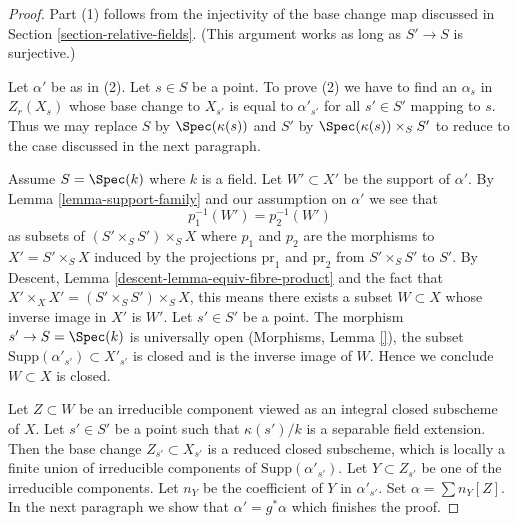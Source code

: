 \begin{proof}
Part (1) follows from the injectivity of the base change map discussed
in Section \ref{section-relative-fields}. (This argument works as
long as $S' \to S$ is surjective.)

\medskip\noindent
Let $\alpha'$ be as in (2). Let $s \in S$ be a point. To prove (2)
we have to find an $\alpha_s$ in $Z_r(X_s)$
whose base change to $X_{s'}$ is equal to $\alpha'_{s'}$
for all $s' \in S'$ mapping to $s$. Thus we may replace $S$ by
$\Spec(\kappa(s))$ and $S'$ by $\Spec(\kappa(s)) \times_S S'$
to reduce to the case discussed in the next paragraph.

\medskip\noindent
Assume $S = \Spec(k)$ where $k$ is a field.
Let $W' \subset X'$ be the support of $\alpha'$.
By Lemma \ref{lemma-support-family}
and our assumption on $\alpha'$ we see that
$$
p_1^{-1}(W') = p_2^{-1}(W')
$$
as subsets of $(S' \times_S S') \times_S X$ where $p_1$ and $p_2$
are the morphisms to $X' = S' \times_S X$ induced by the projections
$\text{pr}_1$ and $\text{pr}_2$ from $S' \times_S S'$ to $S'$.
By Descent, Lemma \ref{descent-lemma-equiv-fibre-product}
and the fact that $X' \times_X X' = (S' \times_S S') \times_S X$,
this means there exists a subset $W \subset X$ whose inverse image in
$X'$ is $W'$. Let $s' \in S'$ be a point.
The morphism $s' \to S = \Spec(k)$ is universally open
(Morphisms, Lemma \ref{}), the subset
$\text{Supp}(\alpha'_{s'}) \subset X'_{s'}$ is closed and
is the inverse image of $W$. Hence we conclude $W \subset X$ is closed.

\medskip\noindent
Let $Z \subset W$ be an irreducible component viewed as an integral
closed subscheme of $X$. Let $s' \in S'$ be a point such that
$\kappa(s')/k$ is a separable field extension. Then the
base change $Z_{s'} \subset X_{s'}$ is a reduced closed subscheme,
which is locally a finite union of irreducible components of
$\text{Supp}(\alpha'_{s'})$. Let $Y \subset Z_{s'}$ be one
of the irreducible components. Let $n_Y$ be the coefficient
of $Y$ in $\alpha'_{s'}$. Set $\alpha = \sum n_Y [Z]$.
In the next paragraph we show that
$\alpha' = g^*\alpha$ which finishes the proof.


\end{proof}

